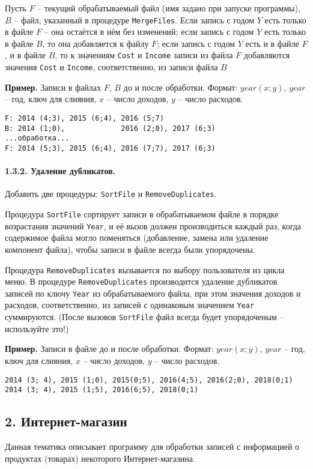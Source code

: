\documentclass[12pt,a4paper]{report}
\begin{document}
Пусть $F$ -- текущий обрабатываемый файл (имя задано при запуске программы), $B$ -- файл, указанный в процедуре \texttt{MergeFiles}.
Если запись с годом $Y$ есть только в файле $F$ -- она остаётся в нём без изменений; если запись с годом $Y$ есть только в файле $B$, то она добавляется к файлу $F$; если запись с годом $Y$ есть и в файле $F$, и в файле $B$, то к значениям \texttt{Cost} и \texttt{Income} записи из файла $F$ добавляются значения \texttt{Cost} и \texttt{Income}, соответственно, из записи файла $B$

\textbf{Пример.} Записи в файлах $F$, $B$ до и после обработки. Формат: $year (x;y)$, $year$ -- год, ключ для слияния, $x$ -- число доходов, $y$ -- число расходов.
\begin{verbatim}
F: 2014 (4;3), 2015 (6;4), 2016 (5;7)
B: 2014 (1;0),             2016 (2;0), 2017 (6;3)
...обработка...
F: 2014 (5;3), 2015 (6;4), 2016 (7;7), 2017 (6;3)
\end{verbatim}


\paragraph{1.3.2. Удаление дубликатов.} Добавить две процедуры: \texttt{SortFile} и \texttt{RemoveDuplicates}.

Процедура \texttt{SortFile} сортирует записи в обрабатываемом файле в порядке возрастания значений \texttt{Year}, и её вызов должен производиться каждый раз, когда содержимое файла могло поменяться (добавление, замена или удаление компонент файла), чтобы записи в файле всегда были упорядочены.

Процедура \texttt{RemoveDuplicates} вызывается по выбору пользователя из цикла меню. В процедуре \texttt{RemoveDuplicates} производится удаление дубликатов записей по ключу \texttt{Year} из обрабатываемого файла, при этом значения доходов и расходов, соответственно, из записей с одинаковым значением \texttt{Year} суммируются. (После вызовов \texttt{SortFile} файл всегда будет упорядоченым -- используйте это!)

\textbf{Пример.} Записи в файле до и после обработки. Формат: $year (x;y)$, $year$ -- год, ключ для слияния, $x$ -- число доходов, $y$ -- число расходов.
\begin{verbatim}
2014 (3; 4), 2015 (1;0), 2015(0;5), 2016(4;5), 2016(2;0), 2018(0;1)
2014 (3; 4), 2015 (1;5), 2016(6;5), 2018(0;1)
\end{verbatim}


\subsection*{2. Интернет-магазин}
Данная тематика описывает программу для обработки записей с информацией о продуктах (товарах) некоторого Интернет-магазина.
\end{document}
